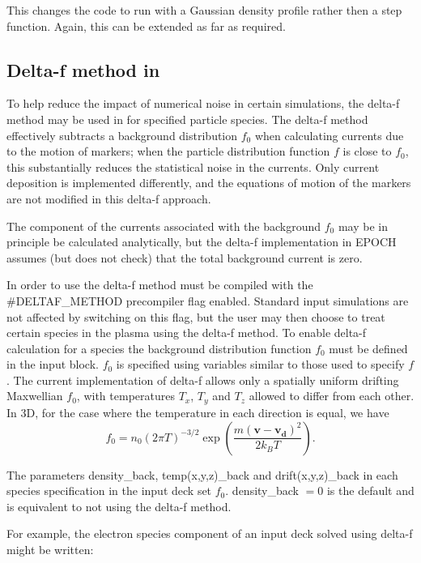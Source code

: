 This changes the code to run with a Gaussian density profile rather then a step
function. Again, this can be extended as far as required.
%

\subsection{\texorpdfstring
  {Delta-f method in {\EPOCH}}
  {Delta-f method in {EPOCH}}}
\label{sec:deltaf}

To help reduce the impact of numerical noise in certain simulations, the
delta-f method may be used in {\EPOCH} for specified particle species. The
delta-f method effectively subtracts a background distribution $f_0$ when
calculating currents due to the motion of markers; when the particle
distribution function $f$ is close to $f_0$, this substantially reduces the
statistical noise in the currents. Only current deposition is implemented
differently, and the equations of motion of the markers are not modified in
this delta-f approach.

The component of the currents associated with the background $f_0$ may be in
principle be calculated analytically, but the delta-f implementation in EPOCH
assumes (but does not check) that the total background current is zero.

In order to use the delta-f method {\EPOCH} must be compiled with the
\#DELTAF\_METHOD precompiler flag enabled. Standard {\EPOCH} input simulations
are not affected by switching on this flag, but the user may then choose to
treat certain species in the plasma using the delta-f method. To enable
delta-f calculation for a species the background distribution function $f_0$
must be defined in the input block. $f_0$ is specified using variables similar
to those used to specify $f$.  The current implementation of delta-f allows
only a spatially uniform drifting Maxwellian $f_0$, with temperatures $T_x$,
$T_y$ and $T_z$ allowed to differ from each other. In 3D, for the case where
the temperature in each direction is equal, we have
\begin{equation*}
  f_0 = n_0 (2 \pi T)^{-3/2}
    \exp\left( \frac{m (\mathbf{v} - \mathbf{v_d})^2}{2 k_B T} \right).
\end{equation*}

The parameters density\_back, temp(x,y,z)\_back and drift(x,y,z)\_back in each
species specification in the input deck set $f_0$. density\_back $=0$ is the
default and is equivalent to not using the delta-f method.

For example, the electron species component of an input deck solved using
delta-f might be written:

